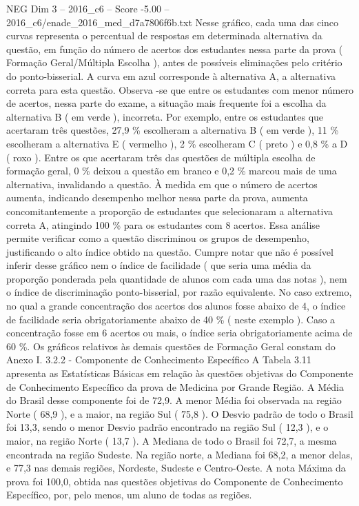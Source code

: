 \begin{textsample}{NEG Dim 3 – 2016\_c6 – Score -5.00 – 2016\_c6/enade\_2016\_med\_d7a7806f6b.txt}
Nesse gráfico, cada uma das cinco curvas representa o percentual de respostas em determinada alternativa da questão, em função do número de acertos dos estudantes nessa parte da prova ( Formação Geral/Múltipla Escolha ), antes de possíveis eliminações pelo critério do ponto-bisserial.
A curva em azul corresponde à alternativa A, a alternativa correta para esta questão.
Observa -se que entre os estudantes com menor número de acertos, nessa parte do exame, a situação mais frequente foi a escolha da alternativa B ( em verde ), incorreta.
Por exemplo, entre os estudantes que acertaram três questões, 27,9 \% escolheram a alternativa B ( em verde ), 11 \% escolheram a alternativa E ( vermelho ), 2 \% escolheram C ( preto ) e 0,8 \% a D ( roxo ).
Entre os que acertaram três das questões de múltipla escolha de formação geral, 0 \% deixou a questão em branco e 0,2 \% marcou mais de uma alternativa, invalidando a questão.
À medida em que o número de acertos aumenta, indicando desempenho melhor nessa parte da prova, aumenta concomitantemente a proporção de estudantes que selecionaram a alternativa correta A, atingindo 100 \% para os estudantes com 8 acertos.
Essa análise permite verificar como a questão discriminou os grupos de desempenho, justificando o alto índice obtido na questão.
Cumpre notar que não é possível inferir desse gráfico nem o índice de facilidade ( que seria uma média da proporção ponderada pela quantidade de alunos com cada uma das notas ), nem o índice de discriminação ponto-bisserial, por razão equivalente.
No caso extremo, no qual a grande concentração dos acertos dos alunos fosse abaixo de 4, o índice de facilidade seria obrigatoriamente abaixo de 40 \% ( neste exemplo ).
Caso a concentração fosse em 6 acertos ou mais, o índice seria obrigatoriamente acima de 60 \%.
Os gráficos relativos às demais questões de Formação Geral constam do Anexo I. 3.2.2 - Componente de Conhecimento Específico A Tabela 3.11 apresenta as Estatísticas Básicas em relação às questões objetivas do Componente de Conhecimento Específico da prova de Medicina por Grande Região.
A Média do Brasil desse componente foi de 72,9.
A menor Média foi observada na região Norte ( 68,9 ), e a maior, na região Sul ( 75,8 ).
O Desvio padrão de todo o Brasil foi 13,3, sendo o menor Desvio padrão encontrado na região Sul ( 12,3 ), e o maior, na região Norte ( 13,7 ).
A Mediana de todo o Brasil foi 72,7, a mesma encontrada na região Sudeste.
Na região norte, a Mediana foi 68,2, a menor delas, e 77,3 nas demais regiões, Nordeste, Sudeste e Centro-Oeste.
A nota Máxima da prova foi 100,0, obtida nas questões objetivas do Componente de Conhecimento Específico, por, pelo menos, um aluno de todas as regiões.

\end{textsample}
